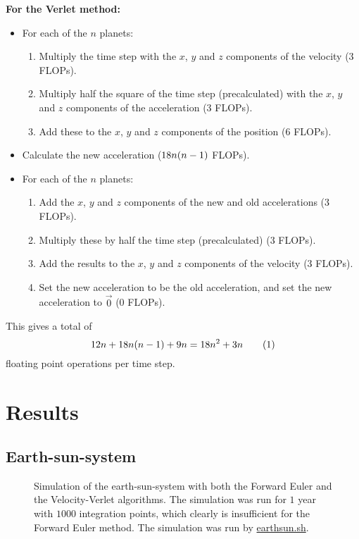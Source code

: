 \documentclass[12pt,english,a4paper]{report}
\newcommand{\eqtag}[1]{\refstepcounter{equation}\tag{\theequation}\label{#1}}
\newcommand{\program}[1]{\href{https://github.com/anjohan/Offentlig/blob/master/FYS3150/Oblig3/#1}{#1}}
\begin{document}
\textbf{For the Verlet method:}
\begin{itemize}
\item For each of the \(n\) planets:
\begin{enumerate}
\item Multiply the time step with the \(x\), \(y\) and \(z\) components of the velocity (3 FLOPs).
\item Multiply half the square of the time step (precalculated) with the \(x\), \(y\) and \(z\) components of the acceleration (3 FLOPs).
\item Add these to the \(x\), \(y\) and \(z\) components of the position (6 FLOPs).
\end{enumerate}
\item Calculate the new acceleration (\(18n\qty(n-1)\) FLOPs).
\item For each of the \(n\) planets:
\begin{enumerate}
\item Add the \(x\), \(y\) and \(z\) components of the new and old accelerations (3 FLOPs).
\item Multiply these by half the time step (precalculated) (3 FLOPs).
\item Add the results to the \(x\), \(y\) and \(z\) components of the velocity (3 FLOPs).
\item Set the new acceleration to be the old acceleration, and set the new acceleration to \(\vec{0}\) (0 FLOPs).
\end{enumerate}
\end{itemize}
This gives a total of \[12n + 18n\qty(n-1) + 9n = 18n^2+3n\eqtag{verletflops}\] floating point operations per time step.

\section{Results}
\subsection{Earth-sun-system}
\begin{figure}[H]
\centering

\caption{Simulation of the earth-sun-system with both the Forward Euler and the Velocity-Verlet algorithms. The simulation was run for \(1\) year with \(\num{1000}\) integration points, which clearly is insufficient for the Forward Euler method. The simulation was run by \program{earthsun.sh}.}
\end{figure}
\end{document}
